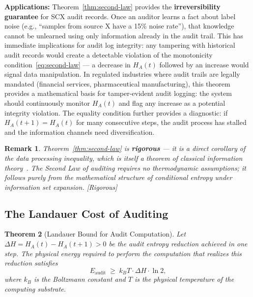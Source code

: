 \documentclass[12pt,a4paper]{article}
\newtheorem{theorem}{Theorem}[section]
\newtheorem{remark}[theorem]{Remark}
\newcommand{\rigorous}{\textcolor{green!50!black}{\small\textsf{[Rigorous]}}}
\begin{document}
\medskip\noindent
\textbf{Applications:}
Theorem~\ref{thm:second-law} provides the \textbf{irreversibility guarantee}
for SCX audit records.  Once an auditor learns a fact about label noise (e.g.,
``samples from source X have a 15\% noise rate''), that knowledge cannot be
unlearned using only information already in the audit trail.  This has
immediate implications for audit log integrity: any tampering with historical
audit records would create a detectable violation of the monotonicity
condition~\eqref{eq:second-law} — a decrease in $H_A(t)$ followed by an
increase would signal data manipulation.  In regulated industries where audit
trails are legally mandated (financial services, pharmaceutical manufacturing),
this theorem provides a mathematical basis for tamper-evident audit logging:
the system should continuously monitor $H_A(t)$ and flag any increase as a
potential integrity violation.  The equality condition further provides a
diagnostic: if $H_A(t+1)=H_A(t)$ for many consecutive steps, the audit
process has stalled and the information channels need diversification.

\begin{remark}
Theorem~\ref{thm:second-law} is \textbf{rigorous} — it is a direct corollary
of the data processing inequality, which is itself a theorem of classical
information theory~\citep{cover1999elements}.  The Second Law of auditing
requires no thermodynamic assumptions; it follows purely from the
mathematical structure of conditional entropy under information set expansion.
\rigorous
\end{remark}

\subsection{The Landauer Cost of Auditing}

\begin{theorem}[Landauer Bound for Audit Computation]
\label{thm:landauer}
Let $\Delta H = H_A(t) - H_A(t+1) > 0$ be the audit entropy reduction achieved
in one step.  The physical energy required to perform the computation that
realizes this reduction satisfies
\begin{equation}\label{eq:landauer-cost}
    E_{\mathrm{audit}} \;\geq\;
    k_B T \cdot \Delta H \cdot \ln 2,
\end{equation}
where $k_B$ is the Boltzmann constant and $T$ is the physical temperature of
the computing substrate.
\end{theorem}
\end{document}
